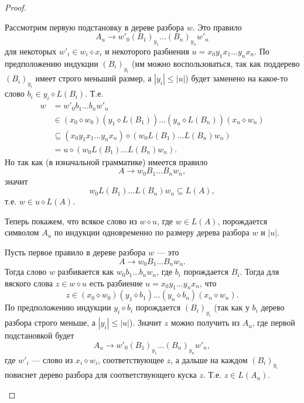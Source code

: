 \documentclass[12pt,a4paper]{article}
\begin{document}
\begin{problem}{8}
\begin{enumerate}
\begin{proof}
\begin{enumerate}
                            Рассмотрим первую подстановку в дереве разбора $w$. Это правило
                            \[A_u \to w'_0 (B_1)_{y_1} \dots (B_n)_{y_n} w'_n\]
                            для некоторых $w'_i \in w_i \diamond x_i$ и некоторого разбиения $u = x_0 y_1 x_1 \dots y_n x_n$. По предположению индукции $(B_i)_{y_i}$ (им можно воспользоваться, так как поддерево $(B_i)_{y_i}$ имеет строго меньший размер, а $|y_i| \leqslant |u|$) будет заменено на какое-то слово $b_i \in y_i \diamond L(B_i)$. Т.е.
                            \begin{align*}
                                w
                                &= w'_0 b_1 \dots b_n w'_n\\
                                &\in (x_0 \diamond w_0) (y_1 \diamond L(B_1)) \dots (y_n \diamond L(B_n)) (x_n \diamond w_n)\\
                                &\subseteq (x_0 y_1 x_1 \dots y_n x_n) \diamond (w_0 L(B_1) \dots L(B_n) w_n)\\
                                &= u \diamond (w_0 L(B_1) \dots L(B_n) w_n).
                            \end{align*}
                            Но так как (в изначальной грамматике) имеется правило
                            \[A \to w_0 B_1 \dots B_n w_n,\]
                            значит
                            \[w_0 L(B_1) \dots L(B_n) w_n \subseteq L(A),\]
                            т.е. $w \in u \diamond L(A)$.
        
                            Теперь покажем, что всякое слово из $w \diamond u$, где $w \in L(A)$, порождается символом $A_u$ по индукции одновременно по размеру дерева разбора $w$ и $|u|$.
                            
                            Пусть первое правило в дереве разбора $w$ --- это
                            \[A \to w_0 B_1 \dots B_n w_n.\]
                            Тогда слово $w$ разбивается как $w_0 b_1 \dots b_n w_n$, где $b_i$ порождается $B_i$. Тогда для вяского слова $z \in w \diamond u$ есть разбиение $u = x_0 y_1 \dots y_n x_n$, что
                            \[z \in (x_0 \diamond w_0) (y_1 \diamond b_1) \dots (y_n \diamond b_n) (x_n \diamond w_n).\]
                            По предположению индукции $y_i \diamond b_i$ порождается $(B_i)_{y_i}$ (так как у $b_i$ дерево разбора строго меньше, а $|y_i| \leqslant |u|$). Значит $z$ можно получить из $A_u$, где первой подстановкой будет
                            \[A_u \to w'_0 (B_1)_{y_1} \dots (B_n)_{y_n} w'_n,\]
                            где $w'_i$ --- слово из $x_i \diamond w_i$, соответствующее $z$, а дальше на каждом $(B_i)_{y_i}$ повиснет дерево разбора для соответствующего куска $z$. Т.е. $z \in L(A_u)$.
        

\end{enumerate}
\end{proof}
\end{enumerate}
\end{problem}
\end{document}
